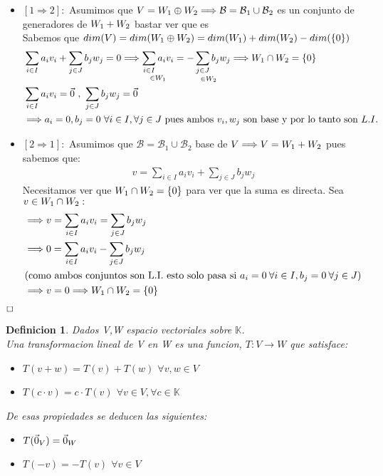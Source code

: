 \documentclass[]{article}
\newtheorem{definition}{Definicion}
\newenvironment{proof}{\noindent{\bf Prueba:}}{$\hfill \Box$ \vspace{10pt}}
\newcommand{\K}{
    \mathbb{K}
}
\newcommand{\ida}{\Longrightarrow}
\newcommand{\base}{\text{$\mathcal{B}$}}
\begin{document}
\begin{proof}
    \begin{itemize}
        \item $[1 \ida 2]:$ Asumimos que $V=\W{1}\oplus\W{2} \ida \base = \base_1 \cup \base_2$ es un conjunto de generadores de
        $\text{$W_{1}$}+\text{$W_{2}$}$ bastar ver que es \li\\
        Sabemos que $dim(V)=dim(\text{$W_{1}$}\oplus\text{$W_{2}$})=dim(\text{$W_{1}$})+dim(\text{$W_{2}$})-dim(\text{$\{ {0} \}$})$
        \begin{align*}
            &\sum_{i \in I} a_i v_i + \sum_{j \in J} b_j w_j = 0 \ida
            \underset{\in \W{1}}{\sum_{i \in I} a_i v_i} = \underset{\in \W{2}}{-\sum_{j \in J} b_j w_j} \ida \W{1}\cap\W{2}=\conjunto{0}\\
            &\sum_{i \in I} a_i v_i =  \cero \text{ , } \sum_{j \in J} b_j w_j = \cero\\
            &\ida a_i=0,b_j=0 \text{ $\forall i \in I, \forall j \in J$ pues ambos $v_i,w_j$ son base y por lo tanto son } \li
        \end{align*}
        \item $[2 \ida 1]:$ Asumimos que $\base=\base_1 \cup \base_2$  base de $V \ida V=\W{1}+\W{2}$ pues sabemos que:
        \begin{align*}
            v=\sum_{i \in I}a_i v_i + \sum_{j \in J}b_j w_j
        \end{align*}
        Necesitamos ver que $\text{$W_{1}$}\cap\text{$W_{2}$}=\text{$\{ {0} \}$}$ para ver que la suma es directa. Sea $v\in\text{$W_{1}$}\cap\text{$W_{2}$}:$
        \begin{align*}
            &\ida v=\sum_{i \in I}a_i v_i = \sum_{j \in J}b_j w_j\\
            &\ida 0=\sum_{i \in I}a_i v_i - \sum_{j \in J}b_j w_j\\
            &(\text{como ambos conjuntos son L.I. esto solo pasa si } a_i=0 \:\forall i \in I,b_j=0 \:\forall j \in J)\\
            &\ida v=0\ida \W{1}\cap\W{2}=\conjunto{0}
        \end{align*}
    \end{itemize}
\end{proof}

\newpage
\begin{definition}
    Dados V,W espacio vectoriales sobre $\K$.\\
    Una transformacion lineal de V en W es una funcion, $T:V \to W$ que satisface:
    \begin{itemize}
        \item $T(v+w)=T(v)+T(w)$ \quad $\forall v,w \in V$
        \item $T(c\cdot v)= c\cdot T(v)$ \quad $\forall v\in V, \forall c \in \K$
    \end{itemize}
    De esas propiedades se deducen las siguientes:
    \begin{itemize}
        \item $T(\text{$\vec{0}$}_V)=\text{$\vec{0}$}_W$
        \item $T(-v)=-T(v)$ \quad $\forall v \in V$
    \end{itemize}
\end{definition}
\end{document}
